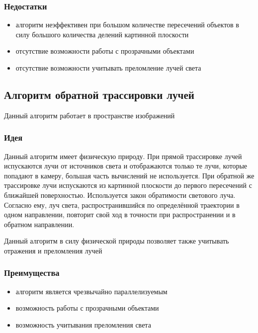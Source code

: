       \subsubsection{Недостатки}
      
      \begin{itemize}
        \item алгоритм неэффективен при большом количестве пересечений объектов в силу большого количества делений картинной плоскости
        \item отсутствие возможности работы с прозрачными объектами
        \item отсутствие возможности учитывать преломление лучей света
      \end{itemize}
 
    \subsection{Алгоритм обратной трассировки лучей}
    
      Данный алгоритм работает в пространстве изображений
    
      \subsubsection{Идея}
      
        Данный алгоритм имеет физическую природу. При прямой трассировке лучей испускаются лучи от источников света и отображаются только те лучи, которые попадают в камеру, большая часть вычислений не используется. При обратной же трассировке лучи испускаются из картинной плоскости до первого пересечений с ближайшей поверхностью. Используется закон обратимости светового луча. Согласно ему, луч света, распространившийся по определённой траектории в одном направлении, повторит свой ход в точности при распространении и в обратном направлении.

        Данный алгоритм в силу физической природы позволяет также учитывать отражения и преломления лучей

      \subsubsection{Преимущества}
      
        \begin{itemize}
          \item алгоритм является чрезвычайно параллелизуемым
          \item возможность работы с прозрачными объектами
          \item возможность учитывания преломления света
        \end{itemize}

